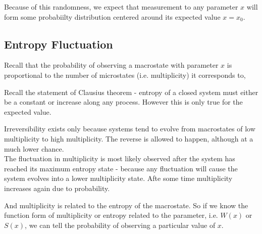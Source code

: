 \documentclass[class=article, crop=false, 12pt]{standalone}
\begin{document}

Because of this randomness, 
we expect that measurement to any parameter $x$ will form some probabiilty distribution centered around its expected value $x=x_0$.
\begin{center}
\end{center}



\subsection{Entropy Fluctuation}

Recall that the probability of observing a macrostate with parameter $x$ 
is proportional to the number of microstates (i.e. multiplicity) it corresponds to,


\begin{notation}
    Recall the statement of Clausius theorem - 
    entropy of a closed system must either be a constant 
    or increase along any process.
    However this is only true for the expected value. 

    Irreversibility exists only because systems tend to evolve from 
    macrostates of low multiplicity to high multiplicity.
    The reverse is allowed to happen,
    although at a much lower chance.\\

    The fluctuation in multiplicity is most likely observed after the system has reached its maximum entropy state - 
    because any fluctuation will cause the system evolves into a lower multiplicity state.
    Afte some time  multiplicity increases again due to probability.
\end{notation}







And multiplicity is related to the entropy of the macrostate. 
So if we know the function form of multiplicity or entropy related to the parameter, i.e. $W(x)$ or $S(x)$,
we can tell the probability of observing a particular value of $x$.
\end{document}

